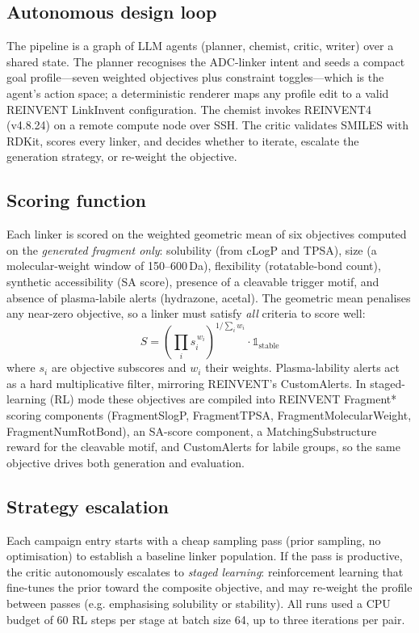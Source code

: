 \documentclass[10pt]{article}
\begin{document}
\subsection{Autonomous design loop}
The pipeline is a graph of LLM agents (planner, chemist, critic, writer) over a shared state. The planner recognises the ADC-linker intent and seeds a compact goal profile---seven weighted objectives plus constraint toggles---which is the agent's action space; a deterministic renderer maps any profile edit to a valid REINVENT LinkInvent configuration. The chemist invokes REINVENT4 (v4.8.24) on a remote compute node over SSH. The critic validates SMILES with RDKit, scores every linker, and decides whether to iterate, escalate the generation strategy, or re-weight the objective.
\subsection{Scoring function}
Each linker is scored on the weighted geometric mean of six objectives computed on the \emph{generated fragment only}: solubility (from cLogP and TPSA), size (a molecular-weight window of 150--600\,Da), flexibility (rotatable-bond count), synthetic accessibility (SA score), presence of a cleavable trigger motif, and absence of plasma-labile alerts (hydrazone, acetal). The geometric mean penalises any near-zero objective, so a linker must satisfy \emph{all} criteria to score well:
\begin{equation}
S = \left(\prod_{i} s_i^{\,w_i}\right)^{1/\sum_i w_i} \cdot \mathbb{1}_{\text{stable}}
\end{equation}
where $s_i$ are objective subscores and $w_i$ their weights. Plasma-lability alerts act as a hard multiplicative filter, mirroring REINVENT's CustomAlerts. In staged-learning (RL) mode these objectives are compiled into REINVENT Fragment* scoring components (FragmentSlogP, FragmentTPSA, FragmentMolecularWeight, FragmentNumRotBond), an SA-score component, a MatchingSubstructure reward for the cleavable motif, and CustomAlerts for labile groups, so the same objective drives both generation and evaluation.
\subsection{Strategy escalation}
Each campaign entry starts with a cheap sampling pass (prior sampling, no optimisation) to establish a baseline linker population. If the pass is productive, the critic autonomously escalates to \emph{staged learning}: reinforcement learning that fine-tunes the prior toward the composite objective, and may re-weight the profile between passes (e.g. emphasising solubility or stability). All runs used a CPU budget of 60 RL steps per stage at batch size 64, up to three iterations per pair.
\end{document}
